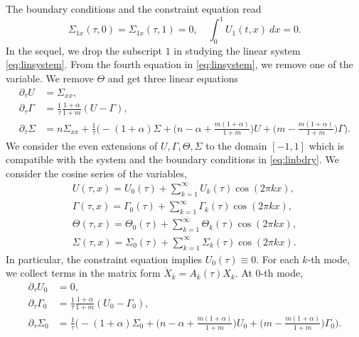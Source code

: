 \documentclass[a4paper,11pt]{article}
\theoremstyle{remark}
\begin{document}
The boundary conditions and the constraint equation read
\begin{equation} \label{eq:linbdry}
 \Sigma_{1x}(\tau,0)=\Sigma_{1x}(\tau,1)=0, \quad \int_0^1 U_1(t,x) \: dx = 0.
\end{equation}
In the sequel, we drop the subscript $1$ in studying the linear system \eqref{eq:linsystem}. From the fourth equation in \eqref{eq:linsystem}, we remove one of the variable. We remove $\Theta$ and get three linear equations
\begin{equation}
 \begin{aligned}
  \partial_\tau U &= \Sigma_{xx},\\
  \partial_\tau\Gamma &= \frac{1}{\tau}\frac{1+\alpha}{1+m}(U-\Gamma),\\
  \partial_\tau\Sigma
  &= n\Sigma_{xx} +\frac{1}{\tau}\Big( -(1+\alpha)\Sigma + \big(n-\alpha + \frac{m(1+\alpha)}{1+m}\big)U + \big(m - \frac{m(1+\alpha)}{1+m}\big)\Gamma\Big).
 \end{aligned}
\end{equation}
We consider the even extensions of $U,\Gamma,\Theta,\Sigma$ to the domain $[-1,1]$ which is compatible with the system and the boundary conditions in \eqref{eq:linbdry}. We consider the cosine series of the variables,
\begin{align*}
 U(\tau,x) = U_0(\tau) + \sum_{k=1}^\infty U_k(\tau)\cos(2\pi kx),\\
 \Gamma(\tau,x) = \Gamma_0(\tau) + \sum_{k=1}^\infty \Gamma_k(\tau)\cos(2\pi kx),\\
 \Theta(\tau,x) = \Theta_0(\tau) + \sum_{k=1}^\infty \Theta_k(\tau)\cos(2\pi kx),\\
 \Sigma(\tau,x) = \Sigma_0(\tau) + \sum_{k=1}^\infty \Sigma_k(\tau)\cos(2\pi kx).
\end{align*}
In particular, the constraint equation implies $U_0(\tau)\equiv0$. For each $k$-th mode, we collect terms in the matrix form $\dot{X}_k = A_k(\tau)X_k$. At $0$-th mode,
\begin{align*}
   \partial_\tau U_0 &= 0,\\
  \partial_\tau\Gamma_0 &= \frac{1}{\tau}\frac{1+\alpha}{1+m}(U_0-\Gamma_0),\\
  \partial_\tau\Sigma_0 &= \frac{1}{\tau}\Big( -(1+\alpha)\Sigma_0 + \big(n-\alpha + \frac{m(1+\alpha)}{1+m}\big)U_0 + \big(m - \frac{m(1+\alpha)}{1+m}\big)\Gamma_0\Big).
\end{align*}
\end{document}

